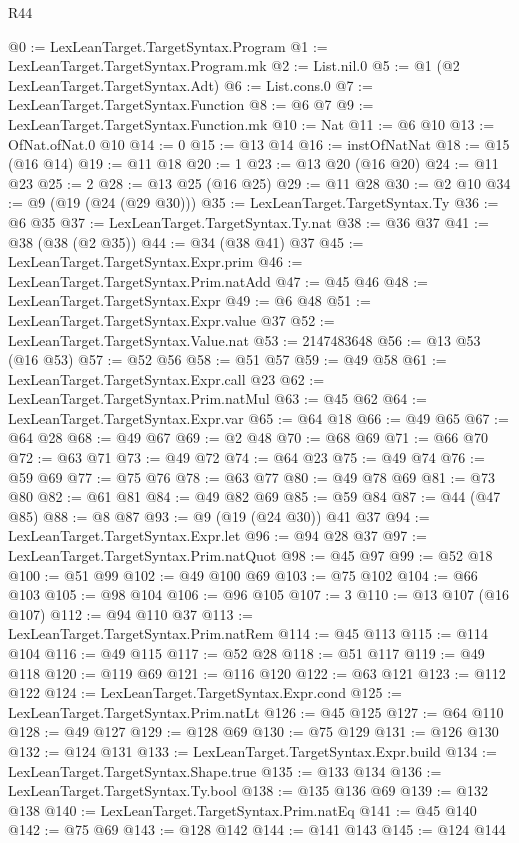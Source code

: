\begin{lexlean}{R44}
\begin{coremodule}
@0 := LexLeanTarget.TargetSyntax.Program
@1 := LexLeanTarget.TargetSyntax.Program.mk
@2 := List.nil.{0}
@5 := @1 (@2 LexLeanTarget.TargetSyntax.Adt)
@6 := List.cons.{0}
@7 := LexLeanTarget.TargetSyntax.Function
@8 := @6 @7
@9 := LexLeanTarget.TargetSyntax.Function.mk
@10 := Nat
@11 := @6 @10
@13 := OfNat.ofNat.{0} @10
@14 := 0
@15 := @13 @14
@16 := instOfNatNat
@18 := @15 (@16 @14)
@19 := @11 @18
@20 := 1
@23 := @13 @20 (@16 @20)
@24 := @11 @23
@25 := 2
@28 := @13 @25 (@16 @25)
@29 := @11 @28
@30 := @2 @10
@34 := @9 (@19 (@24 (@29 @30)))
@35 := LexLeanTarget.TargetSyntax.Ty
@36 := @6 @35
@37 := LexLeanTarget.TargetSyntax.Ty.nat
@38 := @36 @37
@41 := @38 (@38 (@2 @35))
@44 := @34 (@38 @41) @37
@45 := LexLeanTarget.TargetSyntax.Expr.prim
@46 := LexLeanTarget.TargetSyntax.Prim.natAdd
@47 := @45 @46
@48 := LexLeanTarget.TargetSyntax.Expr
@49 := @6 @48
@51 := LexLeanTarget.TargetSyntax.Expr.value @37
@52 := LexLeanTarget.TargetSyntax.Value.nat
@53 := 2147483648
@56 := @13 @53 (@16 @53)
@57 := @52 @56
@58 := @51 @57
@59 := @49 @58
@61 := LexLeanTarget.TargetSyntax.Expr.call @23
@62 := LexLeanTarget.TargetSyntax.Prim.natMul
@63 := @45 @62
@64 := LexLeanTarget.TargetSyntax.Expr.var
@65 := @64 @18
@66 := @49 @65
@67 := @64 @28
@68 := @49 @67
@69 := @2 @48
@70 := @68 @69
@71 := @66 @70
@72 := @63 @71
@73 := @49 @72
@74 := @64 @23
@75 := @49 @74
@76 := @59 @69
@77 := @75 @76
@78 := @63 @77
@80 := @49 @78 @69
@81 := @73 @80
@82 := @61 @81
@84 := @49 @82 @69
@85 := @59 @84
@87 := @44 (@47 @85)
@88 := @8 @87
@93 := @9 (@19 (@24 @30)) @41 @37
@94 := LexLeanTarget.TargetSyntax.Expr.let
@96 := @94 @28 @37
@97 := LexLeanTarget.TargetSyntax.Prim.natQuot
@98 := @45 @97
@99 := @52 @18
@100 := @51 @99
@102 := @49 @100 @69
@103 := @75 @102
@104 := @66 @103
@105 := @98 @104
@106 := @96 @105
@107 := 3
@110 := @13 @107 (@16 @107)
@112 := @94 @110 @37
@113 := LexLeanTarget.TargetSyntax.Prim.natRem
@114 := @45 @113
@115 := @114 @104
@116 := @49 @115
@117 := @52 @28
@118 := @51 @117
@119 := @49 @118
@120 := @119 @69
@121 := @116 @120
@122 := @63 @121
@123 := @112 @122
@124 := LexLeanTarget.TargetSyntax.Expr.cond
@125 := LexLeanTarget.TargetSyntax.Prim.natLt
@126 := @45 @125
@127 := @64 @110
@128 := @49 @127
@129 := @128 @69
@130 := @75 @129
@131 := @126 @130
@132 := @124 @131
@133 := LexLeanTarget.TargetSyntax.Expr.build
@134 := LexLeanTarget.TargetSyntax.Shape.true
@135 := @133 @134
@136 := LexLeanTarget.TargetSyntax.Ty.bool
@138 := @135 @136 @69
@139 := @132 @138
@140 := LexLeanTarget.TargetSyntax.Prim.natEq
@141 := @45 @140
@142 := @75 @69
@143 := @128 @142
@144 := @141 @143
@145 := @124 @144

\end{coremodule}
\end{lexlean}
